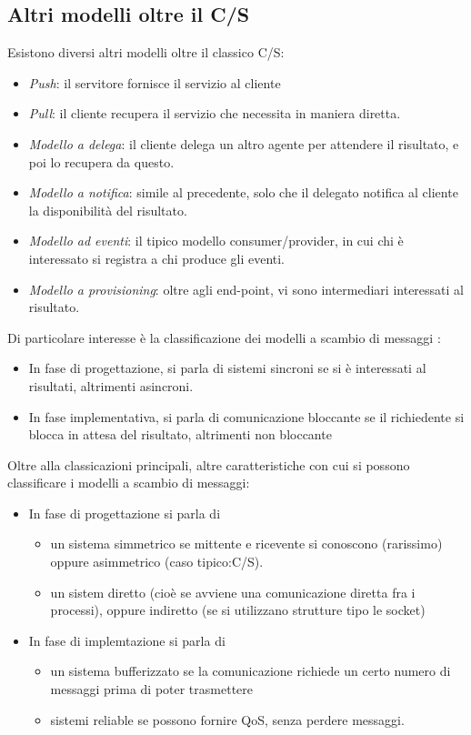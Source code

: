 \subsection{Altri modelli oltre il C/S}
Esistono diversi altri modelli oltre il classico C/S:
\begin{itemize}
 \item \textit{Push}: il servitore fornisce il servizio al cliente
 \item \textit{Pull}: il cliente recupera il servizio che necessita in maniera diretta.
 \item \textit{Modello a delega}: il cliente delega un altro agente per attendere il risultato, e poi lo recupera da
 questo.
 \item \textit{Modello a notifica}: simile al precedente, solo che il delegato notifica al cliente la disponibilità 
 del risultato.
 \item \textit{Modello ad eventi}: il tipico modello consumer/provider, in cui chi è interessato si registra a chi
 produce gli eventi.
 \item \textit{Modello a provisioning}: oltre agli end-point, vi sono intermediari interessati al risultato.
\end{itemize}
Di particolare interesse è la classificazione dei modelli a scambio di messaggi :
\begin{itemize}
 \item In fase di progettazione, si parla di sistemi sincroni se si è interessati al risultati, altrimenti asincroni.
 \item In fase implementativa, si parla di comunicazione bloccante se il richiedente si blocca in attesa del risultato,
 altrimenti non bloccante
\end{itemize}
Oltre alla classicazioni principali, altre caratteristiche con cui si possono classificare i modelli a scambio di
messaggi:
\begin{itemize}
 \item In fase di progettazione si parla di
 \begin{itemize}
  \item un sistema simmetrico se mittente e ricevente si conoscono (rarissimo) oppure asimmetrico (caso tipico:C/S).
  \item un sistem diretto (cioè se avviene una comunicazione diretta fra i processi), oppure indiretto (se si 
  utilizzano strutture tipo le socket)
 \end{itemize}
 \item In fase di implemtazione si parla di
 \begin{itemize}
  \item un sistema bufferizzato se la comunicazione richiede un certo numero di messaggi prima di poter trasmettere
  \item sistemi reliable se possono fornire QoS, senza perdere messaggi.
 \end{itemize}
\end{itemize}
